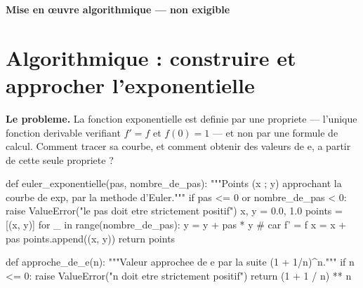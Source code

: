 
\begin{center}\textbf{Mise en œuvre algorithmique — non exigible}\end{center}

\section{Algorithmique : construire et approcher l'exponentielle}



\textbf{Le probleme.} La fonction exponentielle est definie par une propriete
--- l'unique fonction derivable verifiant $f' = f$ et $f(0) = 1$ --- et non
par une formule de calcul. Comment tracer sa courbe, et comment obtenir des
valeurs de $\mathrm{e}$, a partir de cette seule propriete ?


\begin{python}
def euler_exponentielle(pas, nombre_de_pas):
    """Points (x ; y) approchant la courbe de exp, par la methode d'Euler."""
    if pas <= 0 or nombre_de_pas < 0:
        raise ValueError("le pas doit etre strictement positif")
    x, y = 0.0, 1.0
    points = [(x, y)]
    for _ in range(nombre_de_pas):
        y = y + pas * y          # car f' = f
        x = x + pas
        points.append((x, y))
    return points

def approche_de_e(n):
    """Valeur approchee de e par la suite (1 + 1/n)^n."""
    if n <= 0:
        raise ValueError("n doit etre strictement positif")
    return (1 + 1 / n) ** n
\end{python}


